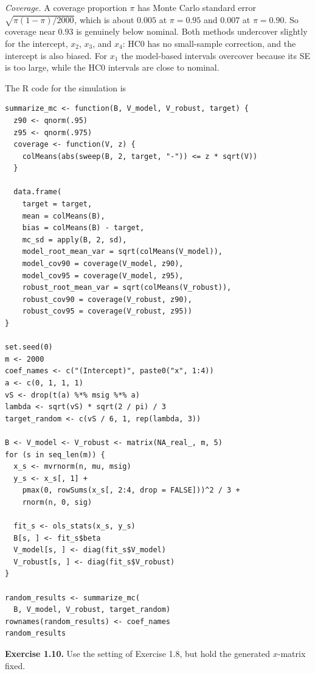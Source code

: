 \documentclass[answers,12pt,addpoints]{exam}
\begin{document}
\begin{questions}
\begin{solution}
\emph{Coverage.} A coverage proportion $\pi$ has Monte Carlo standard error
$\sqrt{\pi(1-\pi)/2000}$, which is about $0.005$ at $\pi=0.95$ and $0.007$ at
$\pi=0.90$. So coverage near $0.93$ is genuinely below nominal. Both
methods undercover slightly for the intercept, $x_2$, $x_3$, and $x_4$: HC0
has no small-sample correction, and the intercept is also biased. For $x_1$
the model-based intervals overcover because its SE is too large, while the
HC0 intervals are close to nominal.
 
The R code for the simulation is
\begin{lstlisting}
summarize_mc <- function(B, V_model, V_robust, target) {
  z90 <- qnorm(.95)
  z95 <- qnorm(.975)
  coverage <- function(V, z) {
    colMeans(abs(sweep(B, 2, target, "-")) <= z * sqrt(V))
  }
 
  data.frame(
    target = target,
    mean = colMeans(B),
    bias = colMeans(B) - target,
    mc_sd = apply(B, 2, sd),
    model_root_mean_var = sqrt(colMeans(V_model)),
    model_cov90 = coverage(V_model, z90),
    model_cov95 = coverage(V_model, z95),
    robust_root_mean_var = sqrt(colMeans(V_robust)),
    robust_cov90 = coverage(V_robust, z90),
    robust_cov95 = coverage(V_robust, z95))
}
 
set.seed(0)
m <- 2000
coef_names <- c("(Intercept)", paste0("x", 1:4))
a <- c(0, 1, 1, 1)
vS <- drop(t(a) %*% msig %*% a)
lambda <- sqrt(vS) * sqrt(2 / pi) / 3
target_random <- c(vS / 6, 1, rep(lambda, 3))
 
B <- V_model <- V_robust <- matrix(NA_real_, m, 5)
for (s in seq_len(m)) {
  x_s <- mvrnorm(n, mu, msig)
  y_s <- x_s[, 1] +
    pmax(0, rowSums(x_s[, 2:4, drop = FALSE]))^2 / 3 +
    rnorm(n, 0, sig)
 
  fit_s <- ols_stats(x_s, y_s)
  B[s, ] <- fit_s$beta
  V_model[s, ] <- diag(fit_s$V_model)
  V_robust[s, ] <- diag(fit_s$V_robust)
}
 
random_results <- summarize_mc(
  B, V_model, V_robust, target_random)
rownames(random_results) <- coef_names
random_results
\end{lstlisting}
\end{solution}
 
\question \textbf{Exercise 1.10.}
Use the setting of Exercise 1.8, but hold the generated $x$-matrix fixed.
 
\end{questions}
\end{document}
